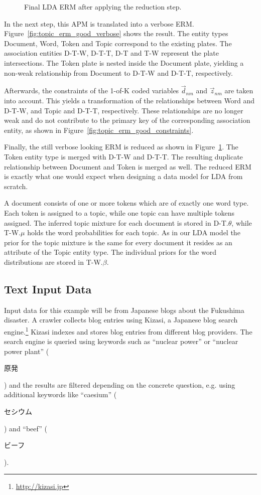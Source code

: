 \begin{figure}[p]
\centering
\scalebox{0.5}{\adjustTikzSize }
\caption[Final LDA ERM after applying the reduction step]{Final LDA ERM after applying the reduction step.}\label{fig:topic_erm_good_reduced}
\end{figure}

In the next step, this APM is translated into a verbose ERM. Figure~\ref{fig:topic_erm_good_verbose} shows the result. The entity types Document, Word, Token and Topic correspond to the existing plates. The association entities D-T-W, D-T-T, D-T and T-W represent the plate intersections. The Token plate is nested inside the Document plate, yielding a non-weak relationship from Document to D-T-W and D-T-T, respectively.

Afterwards, the constraints of the 1-of-K coded variables $\vec d_{nm}$ and $\vec z_{nm}$ are taken into account. This yields a transformation of the relationships between Word and D-T-W, and Topic and D-T-T, respectively. These relationships are no longer weak and do not contribute to the primary key of the corresponding association entity, as shown in Figure~\ref{fig:topic_erm_good_constraints}.

Finally, the still verbose looking ERM is reduced as shown in Figure~\ref{fig:topic_erm_good_reduced}. The Token entity type is merged with D-T-W and D-T-T. The resulting duplicate relationship between Document and Token is merged as well. The reduced ERM is exactly what one would expect when designing a data model for LDA from scratch.

A document consists of one or more tokens which are of exactly one word type. Each token is assigned to a topic, while one topic can have multiple tokens assigned. The inferred topic mixture for each document is stored in D-T.$\theta$, while T-W.$\mu$ holds the word probabilities for each topic. As in our LDA model the prior for the topic mixture is the same for every document it resides as an attribute of the Topic entity type. The individual priors for the word distributions are stored in T-W.$\beta$.

\subsection{Text Input Data}

Input data for this example will be from Japanese blogs about the Fukushima disaster. A crawler collects blog entries using Kizasi, a Japanese blog search engine.\footnote{\url{http://kizasi.jp}} Kizasi indexes and stores blog entries from different blog providers. The search engine is queried using keywords such as ``nuclear power'' or ``nuclear power plant'' (\begin{CJK}{UTF8}{}原発\end{CJK}) and the results are filtered depending on the concrete question, e.g. using additional keywords like ``caesium'' (\begin{CJK}{UTF8}{}セシウム\end{CJK}) and ``beef'' (\begin{CJK}{UTF8}{}ビーフ\end{CJK}).

